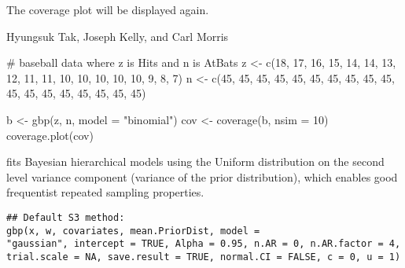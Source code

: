 \documentclass[a4paper]{book}
\begin{document}
%
\begin{Value}
The coverage plot will be displayed again.
\end{Value}
%
\begin{Author}\relax
Hyungsuk Tak, Joseph Kelly, and Carl Morris
\end{Author}
%
\begin{Examples}
\begin{ExampleCode}

  # baseball data where z is Hits and n is AtBats
  z <- c(18, 17, 16, 15, 14, 14, 13, 12, 11, 11, 10, 10, 10, 10, 10,  9,  8,  7)
  n <- c(45, 45, 45, 45, 45, 45, 45, 45, 45, 45, 45, 45, 45, 45, 45, 45, 45, 45)

  b <- gbp(z, n, model = "binomial")
  cov <- coverage(b, nsim = 10)  
  coverage.plot(cov)

\end{ExampleCode}
\end{Examples}
%
\begin{Description}\relax
{} fits Bayesian hierarchical models using the Uniform distribution on the second level variance component (variance of the prior distribution), which enables good frequentist repeated sampling properties. 
\end{Description}
%
\begin{Usage}
\begin{verbatim}
## Default S3 method:
gbp(x, w, covariates, mean.PriorDist, model =
"gaussian", intercept = TRUE, Alpha = 0.95, n.AR = 0, n.AR.factor = 4,
trial.scale = NA, save.result = TRUE, normal.CI = FALSE, c = 0, u = 1)
\end{verbatim}
\end{Usage}
%
\end{document}
